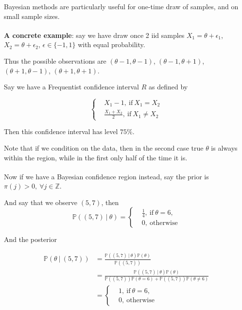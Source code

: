 \documentclass{article}
\begin{document}
Bayesian methods are particularly useful for one-time draw of samples, and on small sample sizes.
\\
\\
\textbf{A concrete example}:
say we have draw once 2 iid samples $X_1 = \theta + \epsilon_1$, $X_2 = \theta + \epsilon_2$,
$\epsilon \in \{-1, 1\}$ with equal probability.

Thus the possible observations are
$(\theta - 1, \theta - 1)$,
$(\theta - 1, \theta + 1)$,
$(\theta + 1, \theta - 1)$,
$(\theta + 1, \theta + 1)$.

Say we have a Frequentist confidence interval $R$ as defined by

\begin{equation}
  \begin{cases}
    & X_1 - 1, ~ \text{if} ~ X_1 = X_2 \\
    & \frac{X_1 + X_2}{2}, ~ \text{if} ~ X_1 \neq X_2
  \end{cases}
\end{equation}

Then this confidence interval has level $75\%$.

Note that if we condition on the data,
then in the second case true $\theta$ is always within the region,
while in the first only half of the time it is.
\\
\\
Now if we have a Bayesian confidence region instead,
say the prior is $\pi(j) > 0, ~ \forall j \in \mathbb{Z}$.

And say that we observe $(5, 7)$, then
\begin{equation}
  \mathbb{P}((5, 7) ~ | ~ \theta) = 
  \begin{cases}
    & \frac{1}{4}, ~ \text{if} ~ \theta = 6, \\
    & 0, ~ \text{otherwise}
  \end{cases}
\end{equation}

And the posterior

\begin{align*}
  \mathbb{P}(\theta ~ | ~ (5, 7)) &= \frac{\mathbb{P}((5, 7) ~ | ~ \theta) \mathbb{P}(\theta)}{\mathbb{P}((5, 7))} \\
                                  &= \frac{\mathbb{P}((5, 7) ~ | ~ \theta) \mathbb{P}(\theta)}{\mathbb{P}((5, 7)) \mathbb{P}(\theta = 6) + \mathbb{P}((5, 7)) \mathbb{P}(\theta \neq 6)} \\
                                  &= \begin{cases}
                                       & 1, ~ \text{if} ~ \theta = 6, \\
                                       & 0, ~ \text{otherwise}
                                     \end{cases}
\end{align*}
\end{document}
